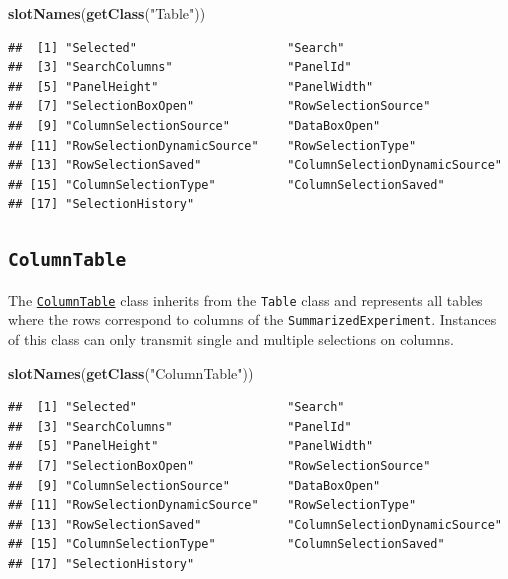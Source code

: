 \documentclass[
]{book}
\newenvironment{Shaded}{\begin{snugshade}}{\end{snugshade}}
\newcommand{\KeywordTok}[1]{\textcolor[rgb]{0.13,0.29,0.53}{\textbf{#1}}}
\newcommand{\NormalTok}[1]{#1}
\newcommand{\StringTok}[1]{\textcolor[rgb]{0.31,0.60,0.02}{#1}}
\begin{document}
\begin{Shaded}
\begin{Highlighting}[]
\KeywordTok{slotNames}\NormalTok{(}\KeywordTok{getClass}\NormalTok{(}\StringTok{"Table"}\NormalTok{))}
\end{Highlighting}
\end{Shaded}

\begin{verbatim}
##  [1] "Selected"                     "Search"                      
##  [3] "SearchColumns"                "PanelId"                     
##  [5] "PanelHeight"                  "PanelWidth"                  
##  [7] "SelectionBoxOpen"             "RowSelectionSource"          
##  [9] "ColumnSelectionSource"        "DataBoxOpen"                 
## [11] "RowSelectionDynamicSource"    "RowSelectionType"            
## [13] "RowSelectionSaved"            "ColumnSelectionDynamicSource"
## [15] "ColumnSelectionType"          "ColumnSelectionSaved"        
## [17] "SelectionHistory"
\end{verbatim}

\hypertarget{columntable}{%
\subsection{\texorpdfstring{\texttt{ColumnTable}}{ColumnTable}}\label{columntable}}

The \href{https://isee.github.io/iSEE/reference/ColumnTable-class.html}{\texttt{ColumnTable}} class inherits from the \texttt{Table} class and represents all tables where the rows correspond to columns of the \texttt{SummarizedExperiment}.
Instances of this class can only transmit single and multiple selections on columns.

\begin{Shaded}
\begin{Highlighting}[]
\KeywordTok{slotNames}\NormalTok{(}\KeywordTok{getClass}\NormalTok{(}\StringTok{"ColumnTable"}\NormalTok{))}
\end{Highlighting}
\end{Shaded}

\begin{verbatim}
##  [1] "Selected"                     "Search"                      
##  [3] "SearchColumns"                "PanelId"                     
##  [5] "PanelHeight"                  "PanelWidth"                  
##  [7] "SelectionBoxOpen"             "RowSelectionSource"          
##  [9] "ColumnSelectionSource"        "DataBoxOpen"                 
## [11] "RowSelectionDynamicSource"    "RowSelectionType"            
## [13] "RowSelectionSaved"            "ColumnSelectionDynamicSource"
## [15] "ColumnSelectionType"          "ColumnSelectionSaved"        
## [17] "SelectionHistory"
\end{verbatim}
\end{document}
